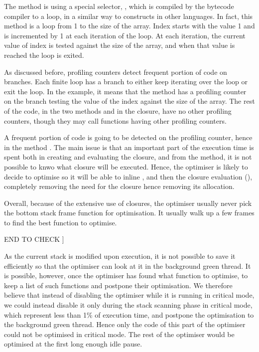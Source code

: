 \documentclass[a4paper,12pt,twoside]{../includes/ThesisStyle}
\begin{document}
The method  is using a special selector, , which is compiled by the bytecode compiler to a loop, in a similar way to  constructs in other languages. In fact, this method is a loop from 1 to the size of the array. Index starts with the value 1 and is incremented by 1 at each iteration of the loop. At each iteration, the current value of index is tested against the size of the array, and when that value is reached the loop is exited.

As discussed before, profiling counters detect frequent portion of code on branches. Each finite loop has a branch to either keep iterating over the loop or exit the loop. In the example, it means that the method  has a profiling counter on the branch testing the value of the index against the size of the array. The rest of the code, in the two methods and in the closure, have no other profiling counters, though they may call functions having other profiling counters.

A frequent portion of code is going to be detected on the profiling counter, hence in the method . The main issue is that an important part of the execution time is spent both in creating and evaluating the closure, and from the  method, it is not possible to knwo what closure will be executed. Hence, the optimiser is likely to decide to optimise  so it will be able to inline , and then the closure evaluation (), completely removing the need for the closure hence removing its allocation.

Overall, because of the extensive use of closures, the optimiser usually never pick the bottom stack frame function for optimisation. It usually walk up a few frames to find the best function to optimise. 

END TO CHECK ]


As the current stack is modified upon execution, it is not possible to save it efficiently so that the optimiser can look at it in the background green thread. It is possible, however, once the optimiser has found what function to optimise, to keep a list of such functions and postpone their optimisation. We therefore believe that instead of disabling the optimiser while it is running in critical mode, we could instead disable it only during the stack scanning phase in critical mode, which represent less than 1\% of execution time, and postpone the optimisation to the background green thread. Hence only the code of this part of the optimiser could not be optimised in critical mode. The rest of the optimiser would be optimised at the first long enough idle pause.
\end{document}
